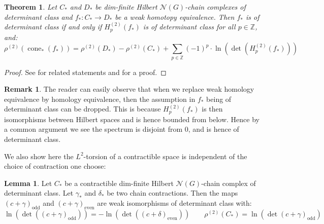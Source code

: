 \documentclass[11pt]{report}
\theoremstyle{definition}
\newtheorem{Lemma}[Def]{Lemma}
\newtheorem{Rmk}{Remark}[chapter]
\theoremstyle{plain}
\newtheorem{Theo}[Def]{Theorem}
\DeclareMathOperator{\cone}{cone}
\newcommand{\integer}{\mathbb{Z}}
\newcommand{\vna}{\mathcal{N}}
\newcommand{\even}{\mathrm{even}}
\newcommand{\odd}{\mathrm{odd}}
\begin{document}
\begin{Theo}\label{3.35(5)}
	Let $C_*$ and $D_*$ be dim-finite Hilbert $\vna(G)$-chain complexes of determinant class and $f_*:C_*\to D_*$ be a weak homotopy equivalence. Then $f_*$ is of determinant class if and only if $H_p^{(2)}(f_*)$ is of determinant class for all $p\in \integer$, and:
	\begin{equation}
	\rho^{(2)}(\cone_*(f_*))=\rho^{(2)}(D_*)-\rho^{(2)}(C_*)+\sum_{p\in \integer}(-1)^p\cdot \ln(\det(H_p^{(2)}(f_*)))
	\end{equation}
\end{Theo}
\begin{proof}
	See \cite[Theorem~3.35(5)]{luck2013} for related statements and \cite[Section~3.3.3]{luck2013} for a proof.
\end{proof}
\begin{Rmk}
	The reader can easily observe that when we replace weak homology equivalence by homology equivalence, then the assumption in $f_*$ being of determinant class can be dropped. This is because $H_p^{(2)}(f_*)$ is then isomorphisms between Hilbert spaces and is hence bounded from below. Hence by a common argument we see the spectrum is disjoint from $0$, and is hence of determinant class.
\end{Rmk}
We also show here the $L^2$-torsion of a contractible space is independent of the choice of contraction one choose:
\begin{Lemma}\label{3.41}
	Let $C_*$ be a contractible dim-finite Hilbert $\vna(G)$-chain complex of determinant class. Let $\gamma_*$ and $\delta_*$  be two chain contractions. Then the maps $(c+\gamma)_{\odd}$ and $(c+\gamma)_\even$ are weak isomorphisms of determinant class with:
	\begin{equation}
	\ln(\det((c+\gamma)_\odd))=-\ln(\det((c+\delta)_\even))\qquad 	\rho^{(2)}(C_*)=\ln(\det(c+\gamma)_{\odd})
	\end{equation}
\end{Lemma}
\end{document}
